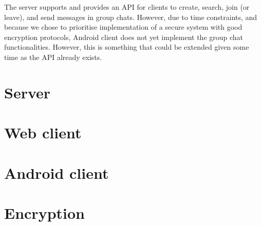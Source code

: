 The server supports and provides an API for clients to create, search, join (or leave), and send messages in group chats. However, due to time constraints, and because we chose to prioritise implementation of a secure system with good encryption protocols, Android client does not yet implement the group chat functionalities. However, this is something that could be extended given some time as the API already exists.

\section{Server}

\label{server}

\section{Web client}

\label{web}



\section{Android client}

\label{android}


\section{Encryption}
\label{encryption}
